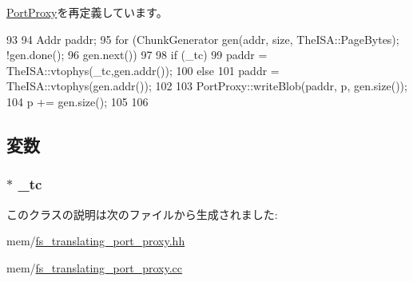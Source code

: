 \hyperlink{classPortProxy_af68c0d93cdb9ff9c4df789c4c9029709}{PortProxy}を再定義しています。


\begin{DoxyCode}
93 {
94     Addr paddr;
95     for (ChunkGenerator gen(addr, size, TheISA::PageBytes); !gen.done();
96          gen.next())
97     {
98         if (_tc)
99             paddr = TheISA::vtophys(_tc,gen.addr());
100         else
101             paddr = TheISA::vtophys(gen.addr());
102 
103         PortProxy::writeBlob(paddr, p, gen.size());
104         p += gen.size();
105     }
106 }
\end{DoxyCode}


\subsection{変数}
\hypertarget{classFSTranslatingPortProxy_a7d52dc2597c78fb5961715634ff972b5}{
\subsubsection[{\_\-tc}]{$\ast$ {\bf \_\-tc}}}
\label{classFSTranslatingPortProxy_a7d52dc2597c78fb5961715634ff972b5}


このクラスの説明は次のファイルから生成されました:\begin{DoxyCompactItemize}
\item 
mem/\hyperlink{fs__translating__port__proxy_8hh}{fs\_\-translating\_\-port\_\-proxy.hh}\item 
mem/\hyperlink{fs__translating__port__proxy_8cc}{fs\_\-translating\_\-port\_\-proxy.cc}\end{DoxyCompactItemize}
